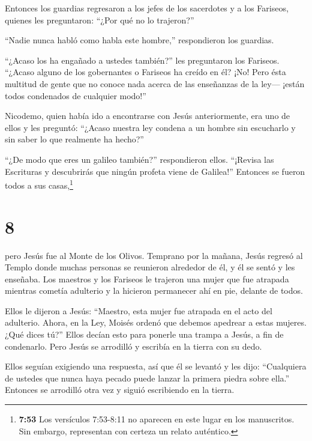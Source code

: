  Entonces los guardias regresaron a los jefes de los
sacerdotes y a los Fariseos, quienes les preguntaron: ``¿Por qué no lo
trajeron?''

 ``Nadie nunca habló como habla este hombre,'' respondieron
los guardias.

 ``¿Acaso los ha engañado a ustedes también?'' les
preguntaron los Fariseos.  ``¿Acaso alguno de los
gobernantes o Fariseos ha creído en él? ¡No!  Pero ésta
multitud de gente que no conoce nada acerca de las enseñanzas de la
ley--- ¡están todos condenados de cualquier modo!''

 Nicodemo, quien había ido a encontrarse con Jesús
anteriormente, era uno de ellos y les preguntó:  ``¿Acaso
nuestra ley condena a un hombre sin escucharlo y sin saber lo que
realmente ha hecho?''

 ``¿De modo que eres un galileo también?'' respondieron
ellos. ``¡Revisa las Escrituras y descubrirás que ningún profeta viene
de Galilea!''  Entonces se fueron todos a sus
casas,\footnote{\textbf{7:53} Los versículos 7:53-8:11 no aparecen en
  este lugar en los manuscritos. Sin embargo, representan con certeza un
  relato auténtico.}

\hypertarget{section-7}{%
\section{8}\label{section-7}}

 pero Jesús fue al Monte de los Olivos. 
Temprano por la mañana, Jesús regresó al Templo donde muchas personas se
reunieron alrededor de él, y él se sentó y les enseñaba. 
Los maestros y los Fariseos le trajeron una mujer que fue atrapada
mientras cometía adulterio y la hicieron permanecer ahí en pie, delante
de todos.

 Ellos le dijeron a Jesús: ``Maestro, esta mujer fue
atrapada en el acto del adulterio.  Ahora, en la Ley, Moisés
ordenó que debemos apedrear a estas mujeres. ¿Qué dices tú?''
 Ellos decían esto para ponerle una trampa a Jesús, a fin de
condenarlo. Pero Jesús se arrodilló y escribía en la tierra con su dedo.

 Ellos seguían exigiendo una respuesta, así que él se
levantó y les dijo: ``Cualquiera de ustedes que nunca haya pecado puede
lanzar la primera piedra sobre ella.''  Entonces se
arrodilló otra vez y siguió escribiendo en la tierra.

